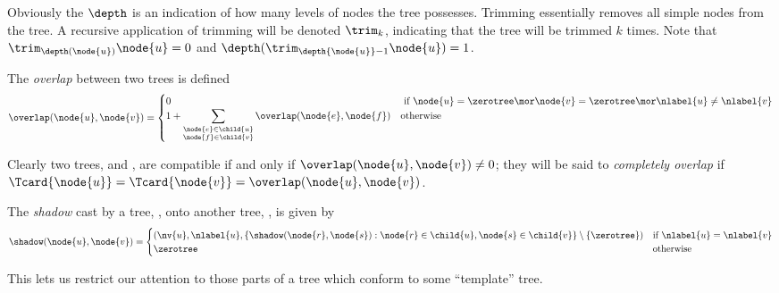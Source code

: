 Obviously the $\depth$ is an indication of how many levels of nodes
the tree possesses. Trimming essentially removes all simple nodes from the tree.
 A recursive application
of trimming will be denoted \(\trim_{k}\), indicating that the tree
 will be trimmed \(k\) times. Note that
\(\trim_{\depth(\node{u})}{\node{u}} = 0\) and
\(\depth(\trim_{\depth{\node{u}}-1}{\node{u}}) = 1\).

\begin{definition}
The \emph{overlap} between two trees is defined
\[
  \overlap(\node{u},\node{v}) = \begin{cases}
    0 & \text{ if } \node{u} = \zerotree \mor \node{v} = \zerotree \mor \nlabel{u} \neq \nlabel{v} \\
    1 + \displaystyle\sum_{\substack{\node{e}\in\child{u} \\
        \node{f}\in\child{v}}} \overlap(\node{e},\node{f}) & \text{otherwise}
  \end{cases}
\]

Clearly two trees,  and , are compatible if and only if \(\overlap(\node{u},\node{v}) \neq 0 \); they will
be said to \emph{completely overlap} if \(\Tcard{\node{u}} = \Tcard{\node{v}} =
\overlap(\node{u},\node{v})\).
\end{definition}

\begin{definition}
The \emph{shadow} cast by a tree, , onto another tree,
, is given by
\[
\shadow(\node{u},\node{v}) = \begin{cases}
  \left(\nv{u},\nlabel{u},\{\shadow(\node{r},\node{s}):\node{r}\in\child{u},\node{s}\in\child{v}\}\setminus\{\zerotree\}\right)&\text{if~}\nlabel{u}=\nlabel{v}\\
  \zerotree&\text{otherwise}
\end{cases}
\]
\end{definition}
This lets us restrict our attention to those parts of a tree which
conform to some ``template'' tree.  

